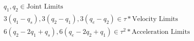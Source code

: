 \documentclass{article}
\begin{document}
\[
\begin{align*}
q_1, q_2 \in \text{Joint Limits} \\
3(q_1 - q_s), 3(q_2 - q_1), 3(q_e - q_2) \in \tau * \text{Velocity Limits}
\\
6(q_2 - 2q_1 + q_s), 6(q_e - 2q_2 + q_1) \in \tau^2 * \text{Acceleration
Limits} \\
\end{align*}
\]
\pagebreak
\end{document}
